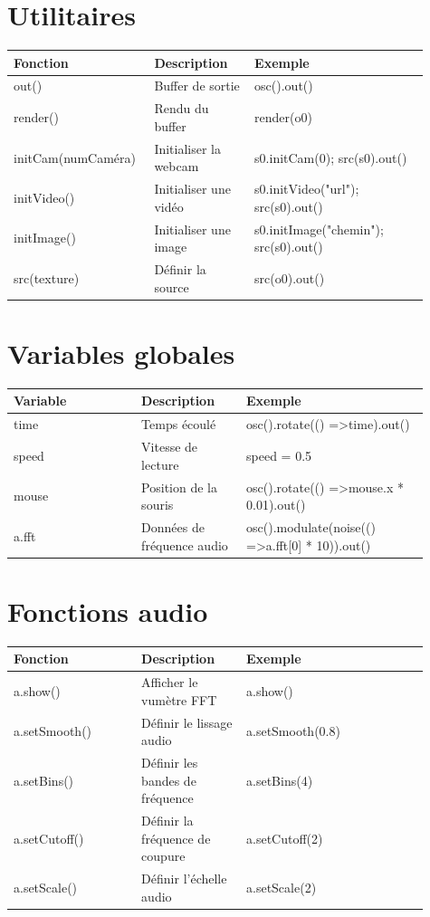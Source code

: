 \documentclass[9pt,oneside]{amsart}
\begin{document}
\section*{Utilitaires}
\begin{tabular}{L{0.28\linewidth}L{0.23\linewidth}L{0.40\linewidth}}
\toprule
\textbf{Fonction} & \textbf{Description} & \textbf{Exemple} \\
\midrule
out() & Buffer de sortie & osc().out() \\
render() & Rendu du buffer & render(o0) \\
initCam(numCaméra) & Initialiser la webcam & s0.initCam(0); src(s0).out() \\
initVideo() & Initialiser une vidéo & s0.initVideo("url"); src(s0).out() \\
initImage() & Initialiser une image & s0.initImage("chemin"); src(s0).out() \\
src(texture) & Définir la source & src(o0).out() \\
\bottomrule
\end{tabular}

\section*{Variables globales}
\begin{tabular}{L{0.28\linewidth}L{0.23\linewidth}L{0.40\linewidth}}
\toprule
\textbf{Variable} & \textbf{Description} & \textbf{Exemple} \\
\midrule
time & Temps écoulé & osc().rotate(() =\textgreater  time).out() \\
speed & Vitesse de lecture & speed = 0.5 \\
mouse & Position de la souris & osc().rotate(() =\textgreater  mouse.x * 0.01).out() \\
a.fft & Données de fréquence audio & osc().modulate(noise(() =\textgreater  a.fft[0] * 10)).out() \\
\bottomrule
\end{tabular}

\section*{Fonctions audio}
\begin{tabular}{L{0.28\linewidth}L{0.23\linewidth}L{0.40\linewidth}}
\toprule
\textbf{Fonction} & \textbf{Description} & \textbf{Exemple} \\
\midrule
a.show() & Afficher le vumètre FFT & a.show() \\
a.setSmooth() & Définir le lissage audio & a.setSmooth(0.8) \\
a.setBins() & Définir les bandes de fréquence & a.setBins(4) \\
a.setCutoff() & Définir la fréquence de coupure & a.setCutoff(2) \\
a.setScale() & Définir l'échelle audio & a.setScale(2) \\
\bottomrule
\end{tabular}
\end{document}
